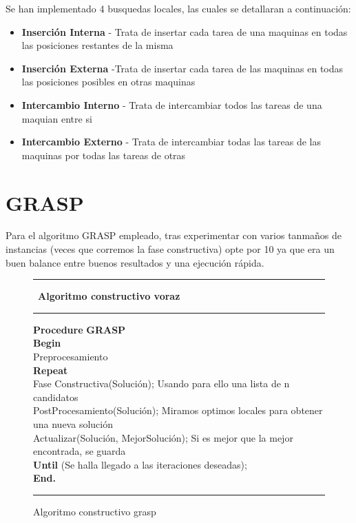 Se han implementado 4 busquedas locales, las cuales se detallaran a continuación:
\begin{itemize}
  \item \textbf{Inserción Interna} - Trata de insertar cada tarea de una maquinas en todas las posiciones restantes de la misma
  \item \textbf{Inserción Externa} -Trata de insertar cada tarea de las maquinas en todas las posiciones posibles en otras maquinas
  \item \textbf{Intercambio Interno} - Trata de intercambiar todos las tareas de una maquian entre si
  \item \textbf{Intercambio Externo} - Trata de intercambiar todas las tareas de las maquinas por todas las tareas de otras
\end{itemize}
 
\section{GRASP}
Para el algoritmo GRASP empleado, tras experimentar con varios tanmaños de instancias (veces que corremos la fase constructiva) opte por 10 ya que era un buen balance entre buenos resultados y una ejecución rápida.

\begin{figure}[h!]
{\small
 \hrule \
 {\bf\small Algoritmo constructivo voraz}
 \hrule
\begin{center}
\begin{tabbing}
\textbf{Procedure} \= \textbf{GRASP} \\
\textbf{Begin} \\
\> Preprocesamiento \\
\> \textbf{Repeat} \\
\> \> Fase Constructiva(Solución); Usando para ello una lista de n candidatos \\
\> \> PostProcesamiento(Solución); Miramos optimos locales para obtener una nueva solución \\
\> \> Actualizar(Solución, MejorSolución); Si es mejor que la mejor encontrada, se guarda \\
\> \textbf{Until} (Se halla llegado a las iteraciones deseadas); \\
\textbf{End.} \\
\end{tabbing}
\end{center}
\hrule
}
\caption{Algoritmo constructivo grasp}
\label{constructivo}
\end{figure}


